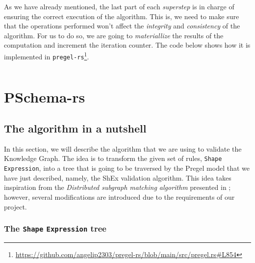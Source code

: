 \begin{code}
    \inputminted{rust}{code/listings/11-6_vprog.rs}
\end{code}

As we have already mentioned, the last part of each \textit{superstep} is in charge of ensuring the correct execution of the algorithm. This is, we need to make sure that the operations performed won't affect the \textit{integrity} and \textit{consistency} of the algorithm. For us to do so, we are going to \textit{materiallize} the results of the computation and increment the iteration counter. The code below shows how it is implemented in \texttt{pregel-rs}\footnote{\url{https://github.com/angelip2303/pregel-rs/blob/main/src/pregel.rs\#L854}}.

\begin{code}
    \inputminted{rust}{code/listings/11-7_collect.rs}
\end{code}

\section{PSchema-rs}

\subsection{The algorithm in a nutshell}

In this section, we will describe the algorithm that we are using to validate the Knowledge Graph. The idea is to transform the given set of rules, \texttt{Shape} \texttt{Expression}, into a tree that is going to be traversed by the Pregel model that we have just described, namely, the ShEx validation algorithm. This idea takes inspiration from the \textit{Distributed subgraph matching algorithm} presented in \cite{Xu2019}; however, several modifications are introduced due to the requirements of our project.

\subsubsection{The \texttt{Shape} \texttt{Expression} tree}

